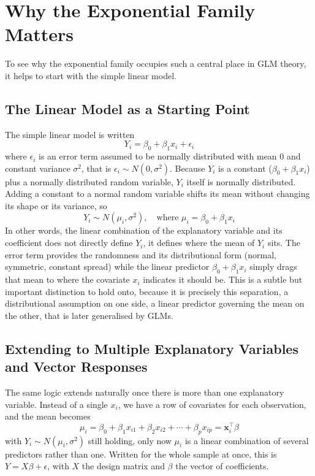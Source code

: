 \documentclass[12pt,a4paper]{report}
\begin{document}
\section{Why the Exponential Family Matters}

To see why the exponential family occupies such a central place in GLM theory, it helps to start with the simple linear model.

\subsection*{The Linear Model as a Starting Point}

The simple linear model is written
\[
Y_i = \beta_0 + \beta_1 x_i + \epsilon_i
\]
where $\epsilon_i$ is an error term assumed to be normally distributed with mean 0 and constant variance $\sigma^2$, that is $\epsilon_i \sim N(0,\sigma^2)$. Because $Y_i$ is a constant ($\beta_0 + \beta_1 x_i$) plus a normally distributed random variable, $Y_i$ itself is normally distributed. Adding a constant to a normal random variable shifts its mean without changing its shape or its variance, so
\[
Y_i \sim N(\mu_i, \sigma^2), \quad \text{where } \mu_i = \beta_0 + \beta_1 x_i
\]
In other words, the linear combination of the explanatory variable and its coefficient does not directly define $Y_i$, it defines where the mean of $Y_i$ sits. The error term provides the randomness and its distributional form (normal, symmetric, constant spread) while the linear predictor $\beta_0 + \beta_1 x_i$ simply drags that mean to where the covariate $x_i$ indicates it should be. This is a subtle but important distinction to hold onto, because it is precisely this separation, a distributional assumption on one side, a linear predictor governing the mean on the other, that is later generalised by GLMs.

\subsection*{Extending to Multiple Explanatory Variables and Vector Responses}

The same logic extends naturally once there is more than one explanatory variable. Instead of a single $x_i$, we have a row of covariates for each observation, and the mean becomes
\[
\mu_i = \beta_0 + \beta_1 x_{i1} + \beta_2 x_{i2} + \cdots + \beta_p x_{ip} = \mathbf{x}_i^\top \beta
\]
with $Y_i \sim N(\mu_i, \sigma^2)$ still holding, only now $\mu_i$ is a linear combination of several predictors rather than one. Written for the whole sample at once, this is $Y = X\beta + \epsilon$, with $X$ the design matrix and $\beta$ the vector of coefficients.
\end{document}
